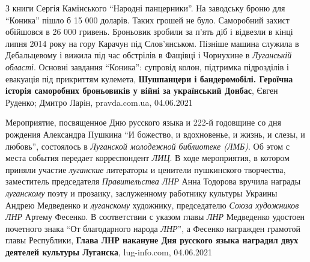 З книги Сергія Камінського \enquote{Народні панцерники}.  На заводську броню
для \enquote{Коника} пішло б 15 000 доларів. Таких грошей не було. Саморобний
захист обійшовся в 26 000 гривень. Броньовик зробили за п'ять діб і відвезли в
кінці липня 2014 року на гору Карачун під Слов'янськом.  Пізніше машина служила
в Дебальцевому і вижила під час обстрілів в Фащівці і Чорнухине в \emph{Луганській
області}. Основні завдання \enquote{Коника}: супровід колон, підтримка
підрозділів і евакуація під прикриттям кулемета,
\textbf{Шушпанцери і бандеромобілі. Героїчна історія саморобних броньовиків у війні за український Донбас},
Євген Руденко; Дмитро Ларін, pravda.com.ua, 04.06.2021


Мероприятие, посвященное Дню русского языка и 222-й годовщине со дня рождения
Александра Пушкина \enquote{И божество, и вдохновенье, и жизнь, и слезы, и
любовь}, состоялось в \emph{Луганской молодежной библиотеке (ЛМБ)}. Об этом с места
события передает корреспондент \emph{ЛИЦ}.  В ходе мероприятия, в котором приняли
участие \emph{луганские} литераторы и ценители пушкинского творчества,
заместитель председателя \emph{Правительства ЛНР} Анна Тодорова вручила награды
\emph{луганскому} поэту и прозаику, заслуженному работнику культуры Украины
Андрею Медведенко и \emph{луганскому} художнику, председателю \emph{Союза художников
ЛНР} Артему Фесенко. В соответствии с указом главы \emph{ЛНР} Медведенко удостоен
почетного знака \enquote{От благодарного народа \emph{ЛНР}}, а Фесенко награжден
грамотой главы Республики,
\textbf{Глава ЛНР накануне Дня русского языка наградил двух деятелей культуры Луганска},
lug-info.com, 04.06.2021

